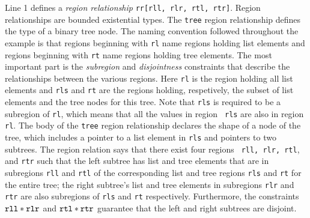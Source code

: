 Line 1 defines a {\em region relationship} {\tt rr[rll, rlr, rtl, rtr]}.  
Region relationships are bounded existential types.  The
{\tt tree} region relationship defines the type of a binary tree
node. The naming convention followed throughout the example is that
regions beginning with {\tt rl} name regions 
holding list elements and regions beginning with {\tt rt} name
regions holding tree elements.  The most important part is the {\em
  subregion} and {\em disjointness} constraints that describe the
relationships between the various regions.  Here {\tt rl} is the
region holding all list elements and {\tt rls} and {\tt rt} are the
regions holding, respetively, the subset of list elements and the tree
nodes for this tree.  Note that {\tt rls} is required to be a
subregion of {\tt rl}, which means that all the values in region {\tt
  rls} are also in region {\tt rl}.  The body of the {\tt tree} region
relationship declares the shape of a node of the tree, which includes
a pointer to a list element in {\tt rls} and pointers to two
subtrees. The region relation says that there exist four regions {\tt
  rll, rlr, rtl}, and {\tt rtr} such that the left subtree has list
and tree elements that are in subregions {\tt rll} and {\tt rtl} of
the corresponding list and tree regions {\tt rls} and {\tt rt} for the
entire tree; the right subtree's list and tree elements in subregions
{\tt rlr} and {\tt rtr} are also subregions of {\tt rls} and {\tt rt}
respectively.  Furthermore, the constraints $\tt rll \ast rlr$ and
$\tt rtl \ast rtr$ guarantee that the left and right subtrees are
disjoint.

